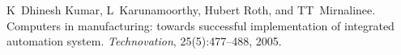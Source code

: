 \begin{thebibliography}{1}

K~Dhinesh Kumar, L~Karunamoorthy, Hubert Roth, and TT~Mirnalinee.
\newblock Computers in manufacturing: towards successful implementation of integrated automation system.
\newblock \emph{Technovation}, 25(5):477–488, 2005.

\end{thebibliography}

